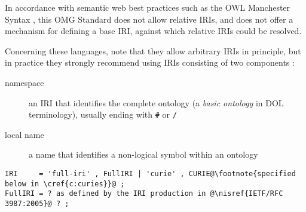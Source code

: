 \documentclass[%
\ifpretendfinal
final%
\else
draft%
\fi,
a4paper,
wd]{isov2}
\makeatletter
\newcommand*\CommentAuthor{}
\renewcommand*\CommentAuthor{#1}}
\newcommand*\CommentDate{}
\renewcommand*\CommentDate{#1}}
\newcommand*\CommentId{}
\renewcommand*\CommentId{#1}}
\newcommand*\CommentType{}
\renewcommand*\CommentType{#1}}
\newcommand*{\SetCommentColorByType}[1]{%
\edef\localType{{#1}}%
\expandafter\ifstrequal\localType{q-aut}{\colorlet{CommentColor}{red}}{%
\expandafter\ifstrequal\localType{q-all}{\colorlet{CommentColor}{orange}}{%
\expandafter\ifstrequal\localType{todo}{\colorlet{CommentColor}{orange}}{%
\expandafter\ifstrequal\localType{fyi}{\colorlet{CommentColor}{lightgray}}{%
\colorlet{CommentColor}{yellow}}}}}}
\newcommand*{\SetCommentPrefixByType}[1]{%
\edef\localType{{#1}}%
\expandafter\@ifmtarg\localType{%
\edef\CommentPrefix{}%
}{%
\caseupper[q]{#1}%
\edef\CommentPrefix{\thestring: }%
}}
\newcommand*{\initComment}[1]{%
\setkeys{Comment}{#1}%
\SetCommentColorByType{\CommentType}%
\relax%
\SetCommentPrefixByType{\CommentType}%
\relax%
}
\newcommand*{\todonote}[2][]{%
\initComment{#1}%
\pdfcomment[author=\CommentAuthor,color=CommentColor,date=\CommentDate,id=\CommentId]{%
\CommentPrefix
#2}}
\newcommand*{\todonote}[2][]{%
\initComment{#1}%
\ednote{\CommentPrefix #2}}
\newcommand*{\nisref}[1]{[#1]}
\newcommand*{\syntax}[1]{\texttt{#1}}
\newcommand*{\IS}{OMG Standard\xspace}
\makeatother
\begin{document}


In accordance with semantic web best practices such as the OWL Manchester Syntax , this \IS does not allow relative IRIs, and does not offer a mechanism for defining a base IRI, against which relative IRIs could be resolved.

Concerning these languages, note that they allow arbitrary IRIs in principle, but in practice they strongly recommend using IRIs consisting of two components :
\begin{description}
\item[namespace] an IRI that identifies the complete ontology (a \emph{basic ontology} in DOL terminology), usually ending with \syntax{\#} or \syntax{/}
\item[local name] a name that identifies a non-logical symbol within an ontology
\end{description}

\begin{lstlisting}[language=ebnf,escapechar=@]
IRI     = 'full-iri' , FullIRI | 'curie' , CURIE@\footnote{specified below in \cref{c:curies}}@ ;
FullIRI = ? as defined by the IRI production in @\nisref{IETF/RFC 3987:2005}@ ? ;
\end{lstlisting}
\end{document}
